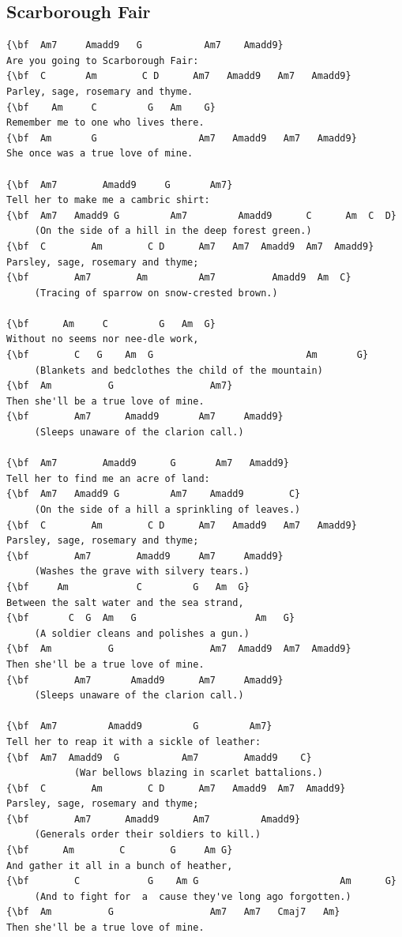 \documentclass[a4paper]{article}
\begin{document}
\subsection{Scarborough Fair}
\begin{Verbatim}[commandchars=\\\{\}]
{\bf  Am7     Amadd9   G           Am7    Amadd9}
Are you going to Scarborough Fair:
{\bf  C       Am        C D      Am7   Amadd9   Am7   Amadd9}
Parley, sage, rosemary and thyme.
{\bf    Am     C         G   Am    G}
Remember me to one who lives there.
{\bf  Am       G                  Am7   Amadd9   Am7   Amadd9}
She once was a true love of mine.

{\bf  Am7        Amadd9     G       Am7}
Tell her to make me a cambric shirt:
{\bf  Am7   Amadd9 G         Am7         Amadd9      C      Am  C  D}
     (On the side of a hill in the deep forest green.)
{\bf  C        Am        C D      Am7   Am7  Amadd9  Am7  Amadd9}
Parsley, sage, rosemary and thyme;
{\bf        Am7        Am         Am7          Amadd9  Am  C}
     (Tracing of sparrow on snow-crested brown.)

{\bf      Am     C         G   Am  G}
Without no seems nor nee-dle work,
{\bf        C   G    Am  G                           Am       G}
     (Blankets and bedclothes the child of the mountain)
{\bf  Am          G                 Am7}
Then she'll be a true love of mine.
{\bf        Am7      Amadd9       Am7     Amadd9}
     (Sleeps unaware of the clarion call.)

{\bf  Am7        Amadd9      G       Am7   Amadd9}
Tell her to find me an acre of land:
{\bf  Am7   Amadd9 G         Am7    Amadd9        C}
     (On the side of a hill a sprinkling of leaves.)
{\bf  C        Am        C D      Am7   Amadd9   Am7   Amadd9}
Parsley, sage, rosemary and thyme;
{\bf        Am7        Amadd9     Am7     Amadd9}
     (Washes the grave with silvery tears.)
{\bf     Am            C         G   Am  G}
Between the salt water and the sea strand,
{\bf       C  G  Am   G                     Am   G}
     (A soldier cleans and polishes a gun.)
{\bf  Am          G                 Am7  Amadd9  Am7  Amadd9}
Then she'll be a true love of mine.
{\bf        Am7       Amadd9      Am7     Amadd9}
     (Sleeps unaware of the clarion call.)

{\bf  Am7         Amadd9         G         Am7}
Tell her to reap it with a sickle of leather:
{\bf  Am7  Amadd9  G           Am7        Amadd9    C}
            (War bellows blazing in scarlet battalions.)
{\bf  C        Am        C D      Am7   Amadd9  Am7  Amadd9}
Parsley, sage, rosemary and thyme;
{\bf        Am7      Amadd9      Am7         Amadd9}
     (Generals order their soldiers to kill.)
{\bf      Am        C        G     Am G}
And gather it all in a bunch of heather,
{\bf        C            G    Am G                         Am      G}
     (And to fight for  a  cause they've long ago forgotten.)
{\bf  Am          G                 Am7   Am7   Cmaj7   Am}
Then she'll be a true love of mine. 

\end{Verbatim}
\newpage
\end{document}
